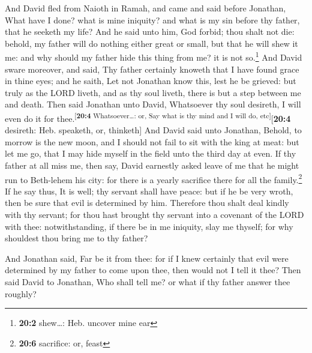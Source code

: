  And David fled from Naioth in Ramah, and came and said
before Jonathan, What have I done? what is mine iniquity? and what is my
sin before thy father, that he seeketh my life?  And he
said unto him, God forbid; thou shalt not die: behold, my father will do
nothing either great or small, but that he will shew it me: and why
should my father hide this thing from me? it is not so.\footnote{\textbf{20:2}
  shew\ldots: Heb. uncover mine ear}  And David sware
moreover, and said, Thy father certainly knoweth that I have found grace
in thine eyes; and he saith, Let not Jonathan know this, lest he be
grieved: but truly as the LORD liveth, and as thy soul liveth, there is
but a step between me and death.  Then said Jonathan unto
David, Whatsoever thy soul desireth, I will even do it for
thee.\textsuperscript{{[}\textbf{20:4} Whatsoever\ldots: or, Say what is
thy mind and I will do, etc{]}}{[}\textbf{20:4} desireth: Heb. speaketh,
or, thinketh{]}  And David said unto Jonathan, Behold, to
morrow is the new moon, and I should not fail to sit with the king at
meat: but let me go, that I may hide myself in the field unto the third
day at even.  If thy father at all miss me, then say,
David earnestly asked leave of me that he might run to Beth-lehem his
city: for there is a yearly sacrifice there for all the
family.\footnote{\textbf{20:6} sacrifice: or, feast}  If
he say thus, It is well; thy servant shall have peace: but if he be very
wroth, then be sure that evil is determined by him. 
Therefore thou shalt deal kindly with thy servant; for thou hast brought
thy servant into a covenant of the LORD with thee: notwithstanding, if
there be in me iniquity, slay me thyself; for why shouldest thou bring
me to thy father?

 And Jonathan said, Far be it from thee: for if I knew
certainly that evil were determined by my father to come upon thee, then
would not I tell it thee?  Then said David to Jonathan,
Who shall tell me? or what if thy father answer thee roughly?


